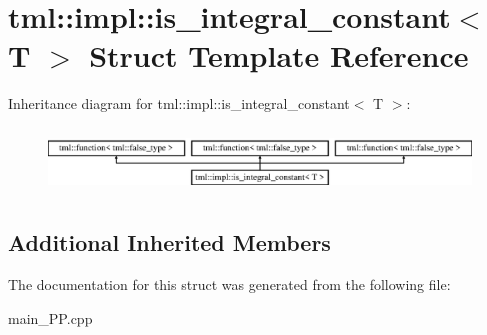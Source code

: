 \hypertarget{structtml_1_1impl_1_1is__integral__constant}{\section{tml\+:\+:impl\+:\+:is\+\_\+integral\+\_\+constant$<$ T $>$ Struct Template Reference}
\label{structtml_1_1impl_1_1is__integral__constant}
}
Inheritance diagram for tml\+:\+:impl\+:\+:is\+\_\+integral\+\_\+constant$<$ T $>$\+:\begin{figure}[H]
\begin{center}
\leavevmode
\includegraphics[height=1.761006cm]{structtml_1_1impl_1_1is__integral__constant}
\end{center}
\end{figure}
\subsection*{Additional Inherited Members}


The documentation for this struct was generated from the following file\+:\begin{DoxyCompactItemize}
\item 
main\+\_\+\+P\+P.\+cpp\end{DoxyCompactItemize}
